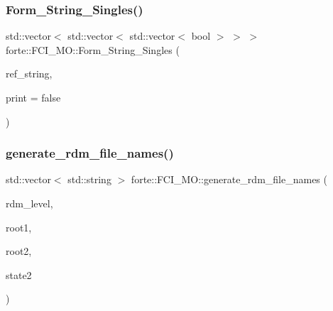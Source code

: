 \mbox{\label{classforte_1_1_f_c_i___m_o_a06d2dc3001cfbbf2668bd698d28f5815}} 
\subsubsection{\texorpdfstring{Form\+\_\+\+String\+\_\+\+Singles()}{Form\_String\_Singles()}}
{\footnotesize\ttfamily std\+::vector$<$ std\+::vector$<$ std\+::vector$<$ bool $>$ $>$ $>$ forte\+::\+F\+C\+I\+\_\+\+M\+O\+::\+Form\+\_\+\+String\+\_\+\+Singles (\begin{DoxyParamCaption}\item[{const std\+::vector$<$ bool $>$ \&}]{ref\+\_\+string,  }\item[{const bool \&}]{print = {\ttfamily false} }\end{DoxyParamCaption})\hspace{0.3cm}{\ttfamily [protected]}}

\mbox{\label{classforte_1_1_f_c_i___m_o_ad06f15485962a81fa6155e5175a5a186}} 
\subsubsection{\texorpdfstring{generate\+\_\+rdm\+\_\+file\+\_\+names()}{generate\_rdm\_file\_names()}}
{\footnotesize\ttfamily std\+::vector$<$ std\+::string $>$ forte\+::\+F\+C\+I\+\_\+\+M\+O\+::generate\+\_\+rdm\+\_\+file\+\_\+names (\begin{DoxyParamCaption}\item[{int}]{rdm\+\_\+level,  }\item[{int}]{root1,  }\item[{int}]{root2,  }\item[{const \mbox{\hyperlink{classforte_1_1_state_info}{State\+Info}} \&}]{state2 }\end{DoxyParamCaption})}



